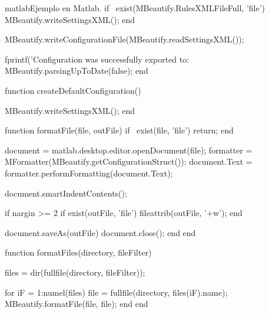 \begin{sourcecode}{matlab}{Ejemplo en Matlab.}
            if ~exist(MBeautify.RulesXMLFileFull, 'file')
                MBeautify.writeSettingsXML();
            end
            
            MBeautify.writeConfigurationFile(MBeautify.readSettingsXML());
            
            fprintf('Configuration was successfully exported to:\n%
            MBeautify.parsingUpToDate(false);
        end
        
        function createDefaultConfiguration()
            
            MBeautify.writeSettingsXML();
        end
        
        function formatFile(file, outFile)
            if ~exist(file, 'file')
                return;
            end
            
            document = matlab.desktop.editor.openDocument(file);
            formatter = MFormatter(MBeautify.getConfigurationStruct());
            document.Text = formatter.performFormatting(document.Text);
            
            document.smartIndentContents();
            
            if nargin >= 2
                if exist(outFile, 'file')
                    fileattrib(outFile, '+w');
                end
                
                document.saveAs(outFile)
                document.close();
            end
        end
        
        function formatFiles(directory, fileFilter)
            
            files = dir(fullfile(directory, fileFilter));
            
            for iF = 1:numel(files)
                file = fullfile(directory, files(iF).name);
                MBeautify.formatFile(file, file);
            end
        end
        

\end{sourcecode}
